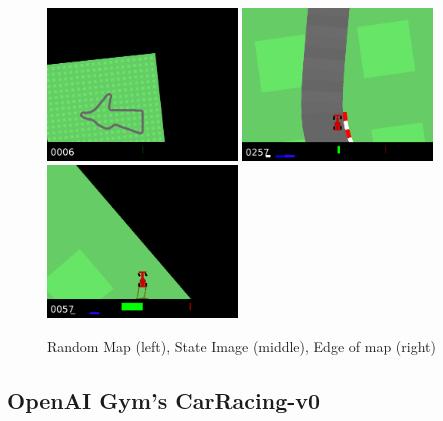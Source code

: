 \begin{figure}[ht!]
	\centering
	\includegraphics[width=0.45\textwidth]{images/car-map.png}
	\includegraphics[width=0.45\textwidth]{images/car-tile.png}
	\includegraphics[width=0.45\textwidth]{images/car-die.png}
	\caption{Random Map (left), State Image (middle), Edge of map (right)}\label{fig:carracing}
\end{figure}

\subsection{OpenAI Gym's CarRacing-v0}

